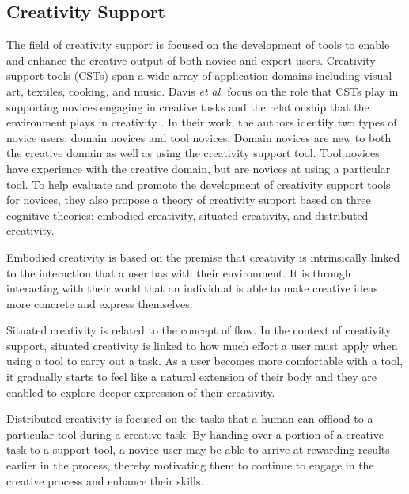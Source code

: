 \subsection{Creativity Support}
The field of creativity support is focused on the development of tools to enable and enhance the creative output of both novice and expert users. Creativity support tools (CSTs) span a wide array of application domains including visual art, textiles, cooking, and music. Davis \textit{et al.} focus on the role that CSTs play in supporting novices engaging in creative tasks and the relationship that the environment plays in creativity \cite{davis2013toward}. 
In their work, the authors identify two types of novice users: domain novices and tool novices. Domain novices are new to both the creative domain as well as using the creativity support tool. Tool novices have experience with the creative domain, but are novices at using a particular tool. To help evaluate and promote the development of creativity support tools for novices, they also propose a theory of creativity support based on three cognitive theories: embodied creativity, situated creativity, and distributed creativity.

Embodied creativity is based on the premise that creativity is intrinsically linked to the interaction that a user has with their environment. It is through interacting with their world that an individual is able to make creative ideas more concrete and express themselves.

Situated creativity is related to the concept of flow. In the context of creativity support, situated creativity is linked to how much effort a user must apply when using a tool to carry out a task. As a user becomes more comfortable with a tool, it gradually starts to feel like a natural extension of their body and they are enabled to explore deeper expression of their creativity.

Distributed creativity is focused on the tasks that a human can offload to a particular tool during a creative task. By handing over a portion of a creative task to a support tool, a novice user may be able to arrive at rewarding results earlier in the process, thereby motivating them to continue to engage in the creative process and enhance their skills.


